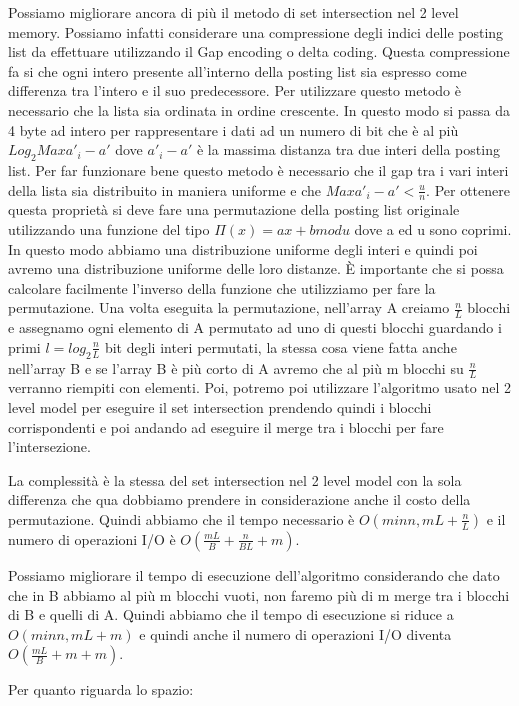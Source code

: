 \documentclass[14pt]{extreport}
\begin{document}
Possiamo migliorare ancora di più il metodo di set intersection nel 2 level memory. Possiamo infatti considerare una compressione degli indici delle posting list da effettuare utilizzando il Gap encoding o delta coding.
Questa compressione fa si che ogni intero presente all'interno della posting list sia espresso come differenza tra l'intero e il suo predecessore. Per utilizzare questo metodo è necessario che la lista sia ordinata in ordine crescente.
In questo modo si passa da 4 byte ad intero per rappresentare i dati ad un numero di bit che è al più $Log_2 Max{a'_i - a'}$ dove ${a'_i - a'}$ è la massima distanza tra due interi della posting list.
Per far funzionare bene questo metodo è necessario che il gap tra i vari interi della lista sia distribuito in maniera uniforme e che $Max{a'_i - a'} < \frac{u}{n}$.
Per ottenere questa proprietà si deve fare una permutazione della posting list originale utilizzando una funzione del tipo $\Pi(x) = ax + b mod u$ dove a ed u sono coprimi. In questo modo abbiamo una distribuzione uniforme degli interi e quindi poi avremo una distribuzione uniforme delle loro distanze.
È importante che si possa calcolare facilmente l'inverso della funzione che utilizziamo per fare la permutazione.
Una volta eseguita la permutazione, nell'array A creiamo $\frac{n}{L}$ blocchi e assegnamo ogni elemento di A permutato ad uno di questi blocchi guardando i primi $l = log_2 \frac{n}{L}$ bit degli interi permutati, la stessa cosa viene fatta anche nell'array B e se l'array B è più corto di A avremo che al più m blocchi su $\frac{n}{L}$ verranno riempiti con elementi.
Poi, potremo poi utilizzare l'algoritmo usato nel 2 level model per eseguire il set intersection prendendo quindi i blocchi corrispondenti e poi andando ad eseguire il merge tra i blocchi per fare l'intersezione.


La complessità è la stessa del set intersection nel 2 level model con la sola differenza che qua dobbiamo prendere in considerazione anche il costo della permutazione. Quindi abbiamo che il tempo necessario è $O(min{n,mL} + \frac{n}{L})$ e il numero di operazioni I/O è $O(\frac{mL}{B} + \frac{n}{BL} + m)$.

Possiamo migliorare il tempo di esecuzione dell'algoritmo considerando che dato che in B abbiamo al più m blocchi vuoti, non faremo più di m merge tra i blocchi di B e quelli di A. Quindi abbiamo che il tempo di esecuzione si riduce a $O(min{n,mL} + m)$ e quindi anche il numero di operazioni I/O diventa $O(\frac{mL}{B} + m + m)$.

Per quanto riguarda lo spazio:
\end{document}
